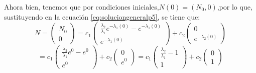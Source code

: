 Ahora bien, tenemos que por condiciones iniciales,$N(0)=(N_{0},0)$,por lo que, sustituyendo en la ecuación \ref{eq:soluciongeneralp5}, se tiene que:
\begin{equation*}
    N=\begin{pmatrix}
    N_{0} \\
    0
    \end{pmatrix}
    =
    c_{1}\begin{pmatrix}
\frac{\lambda_{2}}{\lambda_{1}}e^{-\lambda_{1}(0)} - e^{-\lambda_{1}(0)} \\
e^{-\lambda_{1}(0)}
\end{pmatrix}  
+ c_{2}\begin{pmatrix}
0 \\
e^{-\lambda_{2}(0)}
\end{pmatrix}
\end{equation*}
\begin{equation*}
    =c_{1}\begin{pmatrix}
\frac{\lambda_{2}}{\lambda_{1}}e^{0} - e^{0} \\
e^{0}
\end{pmatrix}  
+ c_{2}\begin{pmatrix}
0 \\
e^{0}
\end{pmatrix}
 =c_{1}\begin{pmatrix}
\frac{\lambda_{2}}{\lambda_{1}} - 1 \\
1
\end{pmatrix}  
+ c_{2}\begin{pmatrix}
0 \\
1
\end{pmatrix}
\end{equation*}

